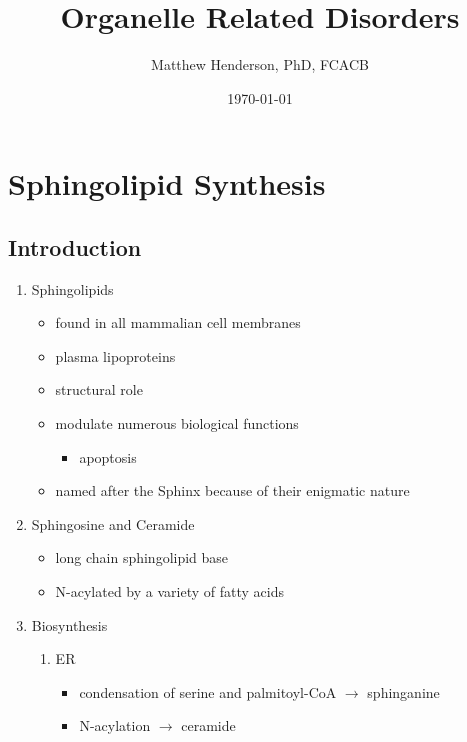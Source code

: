\documentclass{scrartcl}
\author{Matthew Henderson, PhD, FCACB}
\date{\today}
\title{Organelle Related Disorders}
\begin{document}
\maketitle
\tableofcontents


\section{Sphingolipid Synthesis}
\label{sec:orgcecaf0e}
\subsection{Introduction}
\label{sec:org1926ecc}
\begin{enumerate}
\item Sphingolipids
\label{sec:orgb5e0720}
\begin{itemize}
\item found in all mammalian cell membranes
\item plasma lipoproteins
\item structural role
\item modulate numerous biological functions
\begin{itemize}
\item apoptosis
\end{itemize}
\item named after the Sphinx because of their enigmatic nature
\end{itemize}

\item Sphingosine and Ceramide
\label{sec:org93164a0}

\begin{itemize}
\item long chain sphingolipid base
\item N-acylated by a variety of fatty acids
\end{itemize}


\item Biosynthesis
\label{sec:orge35d4a7}
\begin{enumerate}
\item ER
\label{sec:org61eb13e}
\begin{itemize}
\item condensation of serine and palmitoyl-CoA \(\to\) sphinganine
\item N-acylation \(\to\) ceramide
\end{itemize}


\end{enumerate}
\end{enumerate}
\end{document}
